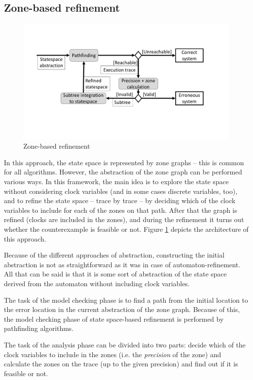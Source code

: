 \subsection{Zone-based refinement}

\begin{figure} 
	\centering
	\includegraphics[width=.7\textwidth]{include/figures/alg_arch_ssp}
	\caption{Zone-based refinement}
	\label{fig:cegarssp}
\end{figure}


 In this approach, the state space is represented by zone graphs -- this is common for all algorithms. However, the abstraction of the zone graph can be performed various ways. In this framework, the main idea is to explore the state space without considering clock variables (and in some cases discrete variables, too), and to refine the state space -- trace by trace -- by deciding which of the clock variables to include for each of the zones on that path. After that the graph is refined (clocks are included in the zones), and during the refinement it turns out whether the counterexample is feasible or not. Figure \ref{fig:cegarssp} depicts the architecture of this approach.

Because of the different approaches of abstraction, constructing the initial abstraction is not as straightforward as it was in case of automaton-refinement. All that can be said is that it is some sort of abstraction of the state space derived from the automaton without including clock variables.

The task of the model checking phase is to find a path from the initial location to the error location in the current abstraction of the zone graph. Because of this, the model checking phase of state space-based refinement is performed by pathfinding algorithms.

The task of the analysis phase can be divided into two parts:  decide which of the clock variables to include in the zones (i.e. the \emph{precision} of the zone) and calculate the zones on the trace (up to the given precision) and find out if it is feasible or not. 

